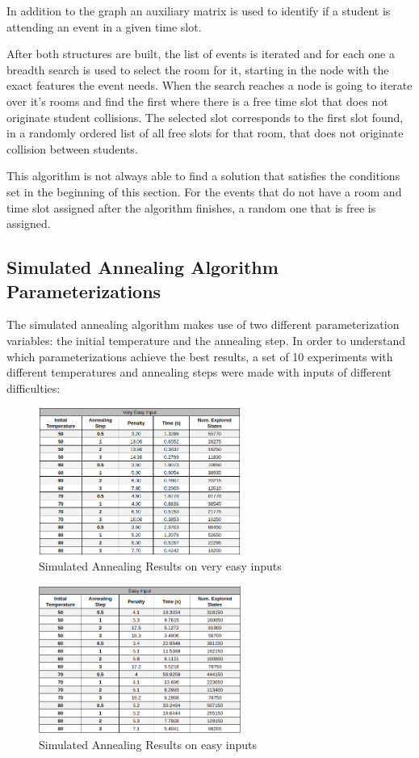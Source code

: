 \documentclass[conference]{IEEEtran}
\begin{document}
In addition to the graph an auxiliary matrix is used to identify if a student is attending an event in a given time slot.

After both structures are built, the list of events is iterated and for each one a breadth search is used to select the room for it, starting in the node with the exact features the event needs. When the search reaches a node is going to iterate over it's rooms and find the first where there is a free time slot that does not originate student collisions. The selected slot corresponds to the first slot found, in a randomly ordered list of all free slots for that room, that does not originate collision between students.

This algorithm is not always able to find a solution that satisfies the conditions set in the beginning of this section. For the events that do not have a room and time slot assigned after the algorithm finishes, a random one that is free is assigned.

\subsection{Simulated Annealing Algorithm Parameterizations}

The simulated annealing algorithm makes use of two different parameterization variables: the initial temperature and the annealing step. In order to understand which parameterizations achieve the best results, a set of 10 experiments with different temperatures and annealing steps were made with inputs of different difficulties:

\begin{figure}[H]
    \centerline{\includegraphics[width=250px]{annealing_very_easy.png}}
    \caption{Simulated Annealing Results on very easy inputs}
\end{figure}

\begin{figure}[H]
    \centerline{\includegraphics[width=250px]{annealing_easy.png}}
    \caption{Simulated Annealing Results on easy inputs}
\end{figure}
\end{document}

